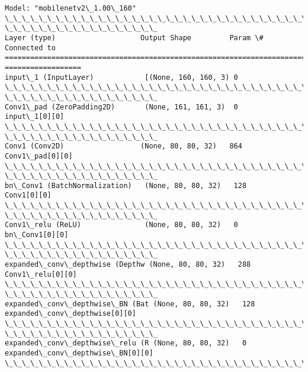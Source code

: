 \documentclass[11pt]{article}
\begin{document}
    \begin{Verbatim}[commandchars=\\\{\}]
Model: "mobilenetv2\_1.00\_160"
\_\_\_\_\_\_\_\_\_\_\_\_\_\_\_\_\_\_\_\_\_\_\_\_\_\_\_\_\_\_\_\_\_\_\_\_\_\_\_\_\_\_\_\_\_\_\_\_\_\_\_\_\_\_\_\_\_\_\_\_\_\_\_\_\_\_\_\_\_\_\_\_\_\_\_\_\_\_\_\_
\_\_\_\_\_\_\_\_\_\_\_\_\_\_\_\_\_\_
Layer (type)                    Output Shape         Param \#     Connected to
================================================================================
==================
input\_1 (InputLayer)            [(None, 160, 160, 3) 0
\_\_\_\_\_\_\_\_\_\_\_\_\_\_\_\_\_\_\_\_\_\_\_\_\_\_\_\_\_\_\_\_\_\_\_\_\_\_\_\_\_\_\_\_\_\_\_\_\_\_\_\_\_\_\_\_\_\_\_\_\_\_\_\_\_\_\_\_\_\_\_\_\_\_\_\_\_\_\_\_
\_\_\_\_\_\_\_\_\_\_\_\_\_\_\_\_\_\_
Conv1\_pad (ZeroPadding2D)       (None, 161, 161, 3)  0           input\_1[0][0]
\_\_\_\_\_\_\_\_\_\_\_\_\_\_\_\_\_\_\_\_\_\_\_\_\_\_\_\_\_\_\_\_\_\_\_\_\_\_\_\_\_\_\_\_\_\_\_\_\_\_\_\_\_\_\_\_\_\_\_\_\_\_\_\_\_\_\_\_\_\_\_\_\_\_\_\_\_\_\_\_
\_\_\_\_\_\_\_\_\_\_\_\_\_\_\_\_\_\_
Conv1 (Conv2D)                  (None, 80, 80, 32)   864         Conv1\_pad[0][0]
\_\_\_\_\_\_\_\_\_\_\_\_\_\_\_\_\_\_\_\_\_\_\_\_\_\_\_\_\_\_\_\_\_\_\_\_\_\_\_\_\_\_\_\_\_\_\_\_\_\_\_\_\_\_\_\_\_\_\_\_\_\_\_\_\_\_\_\_\_\_\_\_\_\_\_\_\_\_\_\_
\_\_\_\_\_\_\_\_\_\_\_\_\_\_\_\_\_\_
bn\_Conv1 (BatchNormalization)   (None, 80, 80, 32)   128         Conv1[0][0]
\_\_\_\_\_\_\_\_\_\_\_\_\_\_\_\_\_\_\_\_\_\_\_\_\_\_\_\_\_\_\_\_\_\_\_\_\_\_\_\_\_\_\_\_\_\_\_\_\_\_\_\_\_\_\_\_\_\_\_\_\_\_\_\_\_\_\_\_\_\_\_\_\_\_\_\_\_\_\_\_
\_\_\_\_\_\_\_\_\_\_\_\_\_\_\_\_\_\_
Conv1\_relu (ReLU)               (None, 80, 80, 32)   0           bn\_Conv1[0][0]
\_\_\_\_\_\_\_\_\_\_\_\_\_\_\_\_\_\_\_\_\_\_\_\_\_\_\_\_\_\_\_\_\_\_\_\_\_\_\_\_\_\_\_\_\_\_\_\_\_\_\_\_\_\_\_\_\_\_\_\_\_\_\_\_\_\_\_\_\_\_\_\_\_\_\_\_\_\_\_\_
\_\_\_\_\_\_\_\_\_\_\_\_\_\_\_\_\_\_
expanded\_conv\_depthwise (Depthw (None, 80, 80, 32)   288
Conv1\_relu[0][0]
\_\_\_\_\_\_\_\_\_\_\_\_\_\_\_\_\_\_\_\_\_\_\_\_\_\_\_\_\_\_\_\_\_\_\_\_\_\_\_\_\_\_\_\_\_\_\_\_\_\_\_\_\_\_\_\_\_\_\_\_\_\_\_\_\_\_\_\_\_\_\_\_\_\_\_\_\_\_\_\_
\_\_\_\_\_\_\_\_\_\_\_\_\_\_\_\_\_\_
expanded\_conv\_depthwise\_BN (Bat (None, 80, 80, 32)   128
expanded\_conv\_depthwise[0][0]
\_\_\_\_\_\_\_\_\_\_\_\_\_\_\_\_\_\_\_\_\_\_\_\_\_\_\_\_\_\_\_\_\_\_\_\_\_\_\_\_\_\_\_\_\_\_\_\_\_\_\_\_\_\_\_\_\_\_\_\_\_\_\_\_\_\_\_\_\_\_\_\_\_\_\_\_\_\_\_\_
\_\_\_\_\_\_\_\_\_\_\_\_\_\_\_\_\_\_
expanded\_conv\_depthwise\_relu (R (None, 80, 80, 32)   0
expanded\_conv\_depthwise\_BN[0][0]
\_\_\_\_\_\_\_\_\_\_\_\_\_\_\_\_\_\_\_\_\_\_\_\_\_\_\_\_\_\_\_\_\_\_\_\_\_\_\_\_\_\_\_\_\_\_\_\_\_\_\_\_\_\_\_\_\_\_\_\_\_\_\_\_\_\_\_\_\_\_\_\_\_\_\_\_\_\_\_\_

\end{Verbatim}
\end{document}
